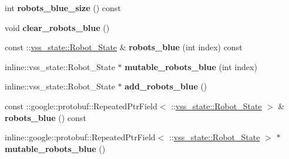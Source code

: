 \begin{DoxyCompactItemize}
\item 
int {\bfseries robots\+\_\+blue\+\_\+size} () const \hypertarget{classvss__state_1_1Global__State_ab19e999740e3aa72946a92322bc7f163}{}\label{classvss__state_1_1Global__State_ab19e999740e3aa72946a92322bc7f163}

\item 
void {\bfseries clear\+\_\+robots\+\_\+blue} ()\hypertarget{classvss__state_1_1Global__State_ae88bcfb62ea5ea68673a48aaec873723}{}\label{classvss__state_1_1Global__State_ae88bcfb62ea5ea68673a48aaec873723}

\item 
const \+::\hyperlink{classvss__state_1_1Robot__State}{vss\+\_\+state\+::\+Robot\+\_\+\+State} \& {\bfseries robots\+\_\+blue} (int index) const \hypertarget{classvss__state_1_1Global__State_a92551a5a96b8585f89cc37c55b0c4e46}{}\label{classvss__state_1_1Global__State_a92551a5a96b8585f89cc37c55b0c4e46}

\item 
inline\+::vss\+\_\+state\+::\+Robot\+\_\+\+State $\ast$ {\bfseries mutable\+\_\+robots\+\_\+blue} (int index)\hypertarget{classvss__state_1_1Global__State_a1caf337906ddf4fa47b606dc76cd8a3b}{}\label{classvss__state_1_1Global__State_a1caf337906ddf4fa47b606dc76cd8a3b}

\item 
inline\+::vss\+\_\+state\+::\+Robot\+\_\+\+State $\ast$ {\bfseries add\+\_\+robots\+\_\+blue} ()\hypertarget{classvss__state_1_1Global__State_a3150ca6510afc0a88b10491642dff24a}{}\label{classvss__state_1_1Global__State_a3150ca6510afc0a88b10491642dff24a}

\item 
const \+::google\+::protobuf\+::\+Repeated\+Ptr\+Field$<$ \+::\hyperlink{classvss__state_1_1Robot__State}{vss\+\_\+state\+::\+Robot\+\_\+\+State} $>$ \& {\bfseries robots\+\_\+blue} () const \hypertarget{classvss__state_1_1Global__State_ad659e30adf37a0e412765337eb28f233}{}\label{classvss__state_1_1Global__State_ad659e30adf37a0e412765337eb28f233}

\item 
inline\+::google\+::protobuf\+::\+Repeated\+Ptr\+Field$<$ \+::\hyperlink{classvss__state_1_1Robot__State}{vss\+\_\+state\+::\+Robot\+\_\+\+State} $>$ $\ast$ {\bfseries mutable\+\_\+robots\+\_\+blue} ()\hypertarget{classvss__state_1_1Global__State_a73be200ff11edfc042221b579672d3b4}{}\label{classvss__state_1_1Global__State_a73be200ff11edfc042221b579672d3b4}

\end{DoxyCompactItemize}
